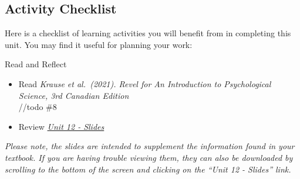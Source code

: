 \documentclass[
]{book}
\providecommand{\tightlist}{%
  \setlength{\itemsep}{0pt}\setlength{\parskip}{0pt}}
\begin{document}
\hypertarget{activity-checklist-11}{%
\subsection*{Activity Checklist}\label{activity-checklist-11}}

Here is a checklist of learning activities you will benefit from in completing this unit. You may find it useful for planning your work:

\begin{reflect}
{Read and Reflect}

\begin{itemize}
\tightlist
\item
  Read \emph{Krause et al.~(2021). Revel for An Introduction to Psychological Science, 3rd Canadian Edition}\\
  //todo \#8
\item
  Review \href{PSYC106-CH16Therapies3rdEd.pptx}{\emph{Unit 12 - Slides}}
\end{itemize}

\emph{Please note, the slides are intended to supplement the information found in your textbook. If you are having trouble viewing them, they can also be downloaded by scrolling to the bottom of the screen and clicking on the ``Unit 12 - Slides'' link.}


\end{reflect}
\end{document}
